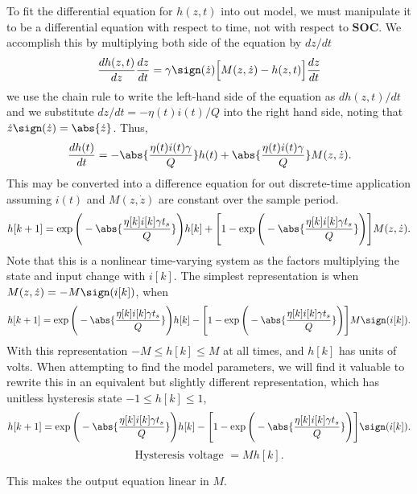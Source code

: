 \documentclass[12pt,a4paper,oneside]{book}
\begin{document}
\begin{onehalfspace}
To fit the differential equation for $h(z,t)$ into out model, we must manipulate it to be a differential equation with respect to time, not with respect to $\mathbf{SOC}$. We accomplish this by multiplying both side of the equation by $dz/dt$
\begin{equation}
	\frac{dh(z,t)}{dz}\frac{dz}{dt}=\gamma\sign(\dot{z})\Big[M(z,\dot{z})-h(z,t)\Big]\frac{dz}{dt}
\end{equation} 
we use the chain rule to write the left-hand side of the equation as $dh(z,t)/dt$ and we substitute $dz/dt = -\eta(t)i(t)/Q$ into the right hand side, noting that $\dot{z}\sign(\dot{z})=\abs{\dot{z}}$. Thus,
\begin{equation}
	\frac{dh(t)}{dt} = -\abs{\frac{\eta(t)i(t)\gamma}{Q}}h(t)+\abs{\frac{\eta(t)i(t)\gamma}{Q}}M(z,\dot{z}).
\end{equation}
This may be converted into a difference equation for out discrete-time application assuming $i(t)$ and $M(z,\dot{z})$ are constant over the sample period. 
\begin{equation}
	h[k+1] = \exp\Bigg(-\abs{\frac{\eta[k]i[k]\gamma t_s}{Q}}\Bigg)h[k] + \Bigg[1-\exp\Bigg(-\abs{\frac{\eta[k]i[k]\gamma t_s}{Q}}\Bigg)\Bigg]M(z,\dot{z}).
\end{equation}
Note that this is a nonlinear time-varying system as the factors multiplying the state and input change with $i[k]$.
The simplest representation is when $M(z,\dot{z})=-M\sign(i[k])$, when 
\begin{equation}
	h[k+1] = \exp\Bigg(-\abs{\frac{\eta[k]i[k]\gamma t_s}{Q}}\Bigg)h[k] - \Bigg[1-\exp\Bigg(-\abs{\frac{\eta[k]i[k]\gamma t_s}{Q}}\Bigg)\Bigg]M\sign(i[k]).
\end{equation}
With this representation $-M\le h[k] \le M$ at all times, and $h[k]$ has units of volts. When attempting to find the model parameters, we will find it valuable to rewrite this in an equivalent but slightly different representation, which has unitless hysteresis state $-1 \le h[k] \le 1$,
\begin{equation}
	h[k+1] = \exp\Bigg(-\abs{\frac{\eta[k]i[k]\gamma t_s}{Q}}\Bigg)h[k] - \Bigg[1-\exp\Bigg(-\abs{\frac{\eta[k]i[k]\gamma t_s}{Q}}\Bigg)\Bigg]\sign(i[k]).
\end{equation}
\begin{equation}
	\text{Hysteresis voltage } = Mh[k].
\end{equation}


This makes the output equation linear in $M$.


\end{onehalfspace}
\end{document}
